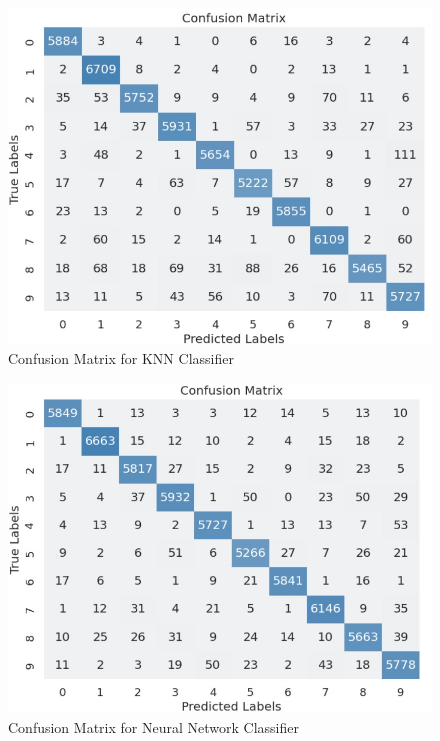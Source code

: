 \begin{figure}[H]
    \centering
    \includegraphics[width=0.6\linewidth]{images/KNN_cm.jpg}
    \caption{Confusion Matrix for KNN Classifier}
    \label{fig:conf4}
    
\end{figure}

\begin{figure}[H]
    \centering
    \includegraphics[width=0.6\linewidth]{images/NN_cm.jpg}
    \caption{Confusion Matrix for Neural Network Classifier}
    \label{fig:conf5}
    
\end{figure}